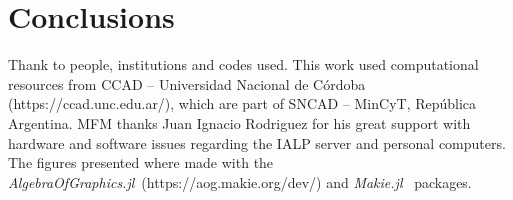 \documentclass[twocolumn]{aa}
\begin{document}
\section{Conclusions}
\label{sec:conclusions}



\begin{acknowledgements}
    Thank to people, institutions and codes used.
    This work used computational resources from CCAD – Universidad Nacional de Córdoba (https://ccad.unc.edu.ar/), which are part of SNCAD – MinCyT, República Argentina.
    MFM thanks Juan Ignacio Rodriguez for his great support with hardware and
    software issues regarding the IALP server and personal computers.
    The figures presented where made with the
    {\it AlgebraOfGraphics.jl}~(https://aog.makie.org/dev/) and
    {\it Makie.jl}~\citep{DanischKrumbiegel2021}
    packages.
\end{acknowledgements}

%
%
%
\end{document}
